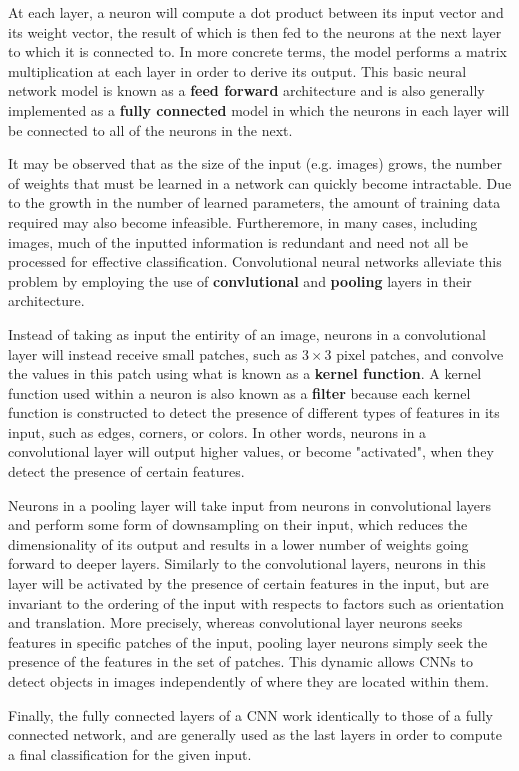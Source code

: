 \documentclass[letterpaper, 12 pt, conference]{ieeeconf}  %
\begin{document}
At each layer, a neuron will compute a dot product between its input vector and its weight vector, the result of which is then fed to the neurons at the next layer to which it is connected to. In more concrete terms, the model performs a matrix multiplication at each layer in order to derive its output. This basic neural network model is known as a \textbf{feed forward} architecture and is also generally implemented as a \textbf{fully connected} model in which the neurons in each layer will be connected to all of the neurons in the next. 
\par
It may be observed that as the size of the input (e.g. images) grows, the number of weights that must be learned in a network can quickly become intractable. Due to the growth in the number of learned parameters, the amount of training data required may also become infeasible. Furtheremore, in many cases, including images, much of the inputted information is redundant and need not all be processed for effective classification. Convolutional neural networks alleviate this problem by employing the use of \textbf{convlutional} and \textbf{pooling} layers in their architecture.
\par
Instead of taking as input the entirity of an image, neurons in a convolutional layer will instead receive small patches, such as $3\times 3$ pixel patches, and convolve the values in this patch using  what is known as a \textbf{kernel function}. A kernel function used within a neuron is also known as a \textbf{filter} because each kernel function is constructed to detect the presence of different types of features in its input, such as edges, corners, or colors. In other words, neurons in a convolutional layer will output higher values, or become "activated", when they detect the presence of certain features. 
\par
Neurons in a pooling layer will take input from neurons in convolutional layers and perform some form of downsampling on their input, which reduces the dimensionality of its output and results in a lower number of weights going forward to deeper layers. Similarly to the convolutional layers, neurons in this layer will be activated by the presence of certain features in the input, but are invariant to the ordering of the input with respects to factors such as orientation and translation. More precisely, whereas convolutional layer neurons seeks features in specific patches of the input, pooling layer neurons simply seek the presence of the features in the set of patches. This dynamic allows CNNs to detect objects in images independently of where they are located within them. 
\par
Finally, the fully connected layers of a CNN work identically to those of a fully connected network, and are generally used as the last layers in order to compute a final classification for the given input. 
\par
\end{document}
